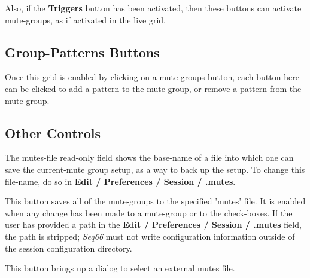    Also, if the \textbf{Triggers} button has been activated,
   then these buttons can activate mute-groups, as if
   activated in the live grid.

\subsection{Group-Patterns Buttons}
\label{sec:mutes_mute_group_patterns_guttons}

   Once this grid is enabled by clicking on a mute-groups button,
   each button here can be clicked to add a pattern to
   the mute-group, or remove a pattern from the mute-group.


\subsection{Other Controls}
\label{sec:mutes_mute_other_controls}

   The mutes-file read-only field
   shows the base-name of a file into which one can save the
   current-mute group setup, as a way to back up the setup.
   To change this file-name, do so in
   \textbf{Edit / Preferences / Session / .mutes}.

   This button saves all of the mute-groups to the specified 'mutes' file.
   It is enabled when any change has been made to a mute-group
   or to the check-boxes.
   If the user has provided a path in the
   \textbf{Edit / Preferences / Session / .mutes} field,
   the path is stripped;
   \textsl{Seq66} must not write configuration information outside of
   the session configuration directory.



   This button brings up a dialog to select an external mutes file.
   

